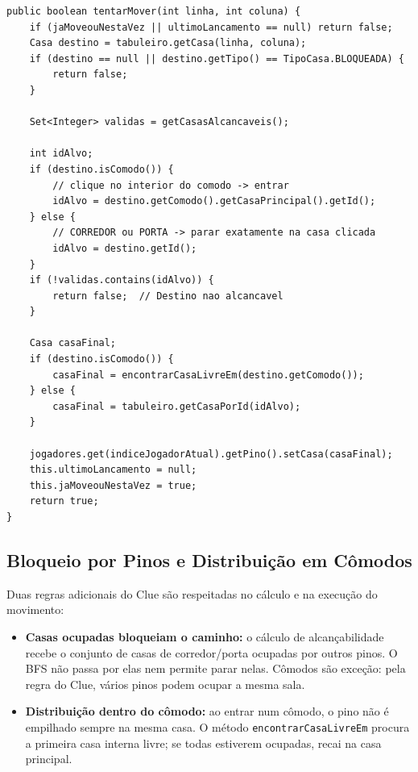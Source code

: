 \documentclass[12pt,a4paper]{report}
\begin{document}
\begin{lstlisting}
public boolean tentarMover(int linha, int coluna) {
    if (jaMoveouNestaVez || ultimoLancamento == null) return false;
    Casa destino = tabuleiro.getCasa(linha, coluna);
    if (destino == null || destino.getTipo() == TipoCasa.BLOQUEADA) {
        return false;
    }

    Set<Integer> validas = getCasasAlcancaveis();

    int idAlvo;
    if (destino.isComodo()) {
        // clique no interior do comodo -> entrar
        idAlvo = destino.getComodo().getCasaPrincipal().getId();
    } else {
        // CORREDOR ou PORTA -> parar exatamente na casa clicada
        idAlvo = destino.getId();
    }
    if (!validas.contains(idAlvo)) {
        return false;  // Destino nao alcancavel
    }

    Casa casaFinal;
    if (destino.isComodo()) {
        casaFinal = encontrarCasaLivreEm(destino.getComodo());
    } else {
        casaFinal = tabuleiro.getCasaPorId(idAlvo);
    }

    jogadores.get(indiceJogadorAtual).getPino().setCasa(casaFinal);
    this.ultimoLancamento = null;
    this.jaMoveouNestaVez = true;
    return true;
}
\end{lstlisting}

\subsection{Bloqueio por Pinos e Distribuição em Cômodos}

Duas regras adicionais do Clue são respeitadas no cálculo e na execução do movimento:

\begin{itemize}
    \item \textbf{Casas ocupadas bloqueiam o caminho:} o cálculo de alcançabilidade recebe o conjunto de casas de corredor/porta ocupadas por outros pinos. O BFS não passa por elas nem permite parar nelas. Cômodos são exceção: pela regra do Clue, vários pinos podem ocupar a mesma sala.
    \item \textbf{Distribuição dentro do cômodo:} ao entrar num cômodo, o pino não é empilhado sempre na mesma casa. O método \texttt{encontrarCasaLivreEm} procura a primeira casa interna livre; se todas estiverem ocupadas, recai na casa principal.
\end{itemize}
\end{document}

